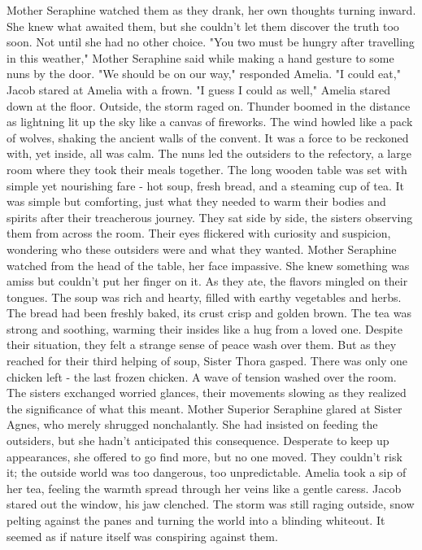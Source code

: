 \documentclass[11pt]{article}
\begin{document}
Mother Seraphine watched them as they drank, her own thoughts turning inward. She knew what awaited them, but she couldn't let them discover the truth too soon. Not until she had no other choice.
"You two must be hungry after travelling in this weather," Mother Seraphine said while making a hand gesture to some nuns by the door.
"We should be on our way," responded Amelia.
"I could eat," Jacob stared at Amelia with a frown.
"I guess I could as well," Amelia stared down at the floor.
Outside, the storm raged on. Thunder boomed in the distance as lightning lit up the sky like a canvas of fireworks. The wind howled like a pack of wolves, shaking the ancient walls of the convent. It was a force to be reckoned with, yet inside, all was calm.
The nuns led the outsiders to the refectory, a large room where they took their meals together. The long wooden table was set with simple yet nourishing fare - hot soup, fresh bread, and a steaming cup of tea. It was simple but comforting, just what they needed to warm their bodies and spirits after their treacherous journey.
They sat side by side, the sisters observing them from across the room. Their eyes flickered with curiosity and suspicion, wondering who these outsiders were and what they wanted. Mother Seraphine watched from the head of the table, her face impassive. She knew something was amiss but couldn't put her finger on it.
As they ate, the flavors mingled on their tongues. The soup was rich and hearty, filled with earthy vegetables and herbs. The bread had been freshly baked, its crust crisp and golden brown. The tea was strong and soothing, warming their insides like a hug from a loved one. Despite their situation, they felt a strange sense of peace wash over them.
But as they reached for their third helping of soup, Sister Thora gasped. There was only one chicken left - the last frozen chicken. A wave of tension washed over the room. The sisters exchanged worried glances, their movements slowing as they realized the significance of what this meant.
Mother Superior Seraphine glared at Sister Agnes, who merely shrugged nonchalantly. She had insisted on feeding the outsiders, but she hadn't anticipated this consequence. Desperate to keep up appearances, she offered to go find more, but no one moved. They couldn't risk it; the outside world was too dangerous, too unpredictable.
Amelia took a sip of her tea, feeling the warmth spread through her veins like a gentle caress.  Jacob stared out the window, his jaw clenched. The storm was still raging outside, snow pelting against the panes and turning the world into a blinding whiteout. It seemed as if nature itself was conspiring against them.
\end{document}

